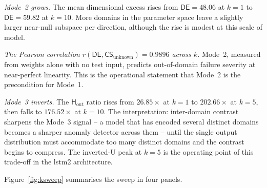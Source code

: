 \documentclass[11pt,a4paper]{article}
\newcommand{\CS}{\mathsf{CS}}
\newcommand{\DE}{\mathsf{DE}}
\newcommand{\Hout}{\mathsf{H}_{\mathrm{out}}}
\begin{document}
\emph{Mode~2 grows.} The mean dimensional excess rises from $\DE = 48.06$ at $k = 1$ to $\DE = 59.82$ at $k = 10$. More domains in the parameter space leave a slightly larger near-null subspace per direction, although the rise is modest at this scale of model.

\emph{The Pearson correlation $r(\DE, \CS_{\mathrm{unknown}}) = 0.9896$ across $k$.} Mode~2, measured from weights alone with no test input, predicts out-of-domain failure severity at near-perfect linearity. This is the operational statement that Mode~2 is the precondition for Mode~1.

\emph{Mode~3 inverts.} The $\Hout$ ratio rises from $26.85\times$ at $k = 1$ to $202.66\times$ at $k = 5$, then falls to $176.52\times$ at $k = 10$. The interpretation: inter-domain contrast sharpens the Mode~3 signal -- a model that has encoded several distinct domains becomes a sharper anomaly detector across them -- until the single output distribution must accommodate too many distinct domains and the contrast begins to compress. The inverted-U peak at $k = 5$ is the operating point of this trade-off in the lstm2 architecture.

Figure~\ref{fig:ksweep} summarises the sweep in four panels.
\end{document}
